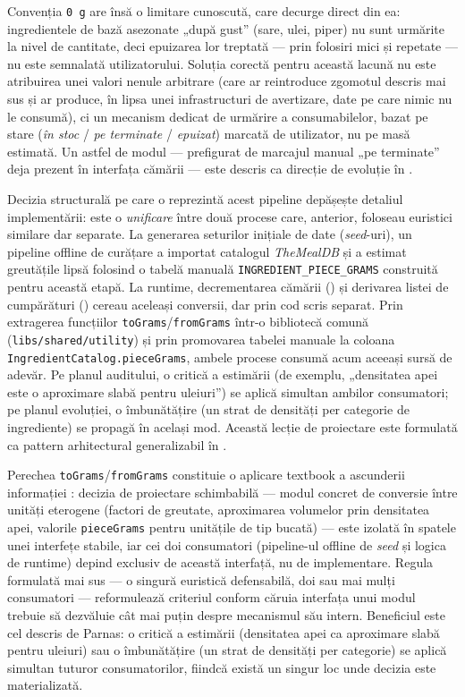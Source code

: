 Convenția \texttt{0 g} are însă o limitare cunoscută, care decurge direct din ea: ingredientele de bază asezonate „după gust” (sare, ulei, piper) nu sunt urmărite la nivel de cantitate, deci epuizarea lor treptată --- prin folosiri mici și repetate --- nu este semnalată utilizatorului. Soluția corectă pentru această lacună nu este atribuirea unei valori nenule arbitrare (care ar reintroduce zgomotul descris mai sus și ar produce, în lipsa unei infrastructuri de avertizare, date pe care nimic nu le consumă), ci un mecanism dedicat de urmărire a consumabilelor, bazat pe stare (\textit{în stoc} / \textit{pe terminate} / \textit{epuizat}) marcată de utilizator, nu pe masă estimată. Un astfel de modul --- prefigurat de marcajul manual „pe terminate” deja prezent în interfața cămării --- este descris ca direcție de evoluție în .

Decizia structurală pe care o reprezintă acest pipeline depășește detaliul implementării: este o \textit{unificare} între două procese care, anterior, foloseau euristici similare dar separate. La generarea seturilor inițiale de date (\textit{seed}-uri), un pipeline offline de curățare a importat catalogul \textit{TheMealDB} și a estimat greutățile lipsă folosind o tabelă manuală \texttt{INGREDIENT\_PIECE\_GRAMS} construită pentru această etapă. La runtime, decrementarea cămării () și derivarea listei de cumpărături () cereau aceleași conversii, dar prin cod scris separat. Prin extragerea funcțiilor \texttt{toGrams}/\texttt{fromGrams} într-o bibliotecă comună (\texttt{libs/shared/utility}) și prin promovarea tabelei manuale la coloana \texttt{IngredientCatalog.pieceGrams}, ambele procese consumă acum aceeași sursă de adevăr. Pe planul auditului, o critică a estimării (de exemplu, „densitatea apei este o aproximare slabă pentru uleiuri”) se aplică simultan ambilor consumatori; pe planul evoluției, o îmbunătățire (un strat de densități per categorie de ingrediente) se propagă în același mod. Această lecție de proiectare este formulată ca pattern arhitectural generalizabil în .

Perechea \texttt{toGrams}/\texttt{fromGrams} constituie o aplicare textbook a ascunderii informației \cite{parnas1972}: decizia de proiectare schimbabilă --- modul concret de conversie între unități eterogene (factori de greutate, aproximarea volumelor prin densitatea apei, valorile \texttt{pieceGrams} pentru unitățile de tip bucată) --- este izolată în spatele unei interfețe stabile, iar cei doi consumatori (pipeline-ul offline de \textit{seed} și logica de runtime) depind exclusiv de această interfață, nu de implementare. Regula formulată mai sus --- o singură euristică defensabilă, doi sau mai mulți consumatori --- reformulează criteriul conform căruia interfața unui modul trebuie să dezvăluie cât mai puțin despre mecanismul său intern. Beneficiul este cel descris de Parnas: o critică a estimării (densitatea apei ca aproximare slabă pentru uleiuri) sau o îmbunătățire (un strat de densități per categorie) se aplică simultan tuturor consumatorilor, fiindcă există un singur loc unde decizia este materializată.

